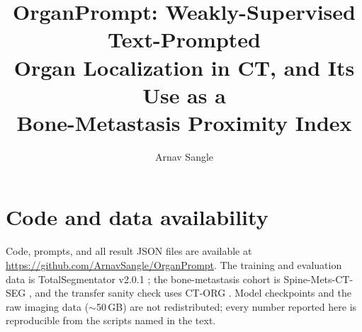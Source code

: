 \documentclass[11pt]{article}
\title{\bfseries OrganPrompt: Weakly-Supervised Text-Prompted\\
       Organ Localization in CT, and Its Use as a\\
       Bone-Metastasis Proximity Index}
\author[1]{Arnav Sangle}
\affil[1]{\small [affiliation to be added]}
\affil[ ]{\small Correspondence: \href{mailto:arnavsangle08@gmail.com}{arnavsangle08@gmail.com}}
\date{}
\begin{document}
\maketitle

\begin{abstract}

\end{abstract}








\section*{Code and data availability}
Code, prompts, and all result JSON files are available at
\url{https://github.com/ArnavSangle/OrganPrompt}. The training and evaluation data is
TotalSegmentator v2.0.1 \cite{wasserthal2023totalsegdataset}; the bone-metastasis cohort
is Spine-Mets-CT-SEG \cite{pieper2024spinemets}, and the transfer sanity check uses
CT-ORG \cite{rister2020ctorg}. Model
checkpoints and the raw imaging data ($\sim$50\,GB) are not redistributed; every number
reported here is reproducible from the scripts named in the text.




\appendix



\end{document}
